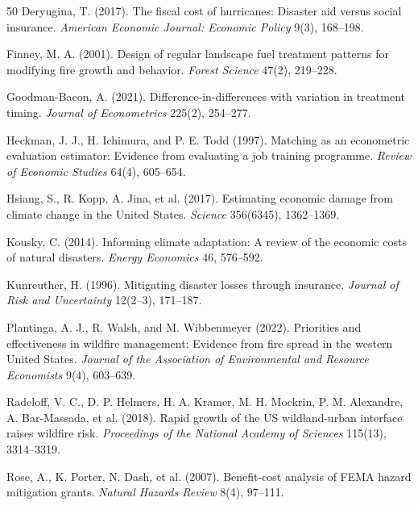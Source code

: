 \documentclass[12pt, letterpaper]{article}
\begin{document}
\begin{thebibliography}{50}
Deryugina, T. (2017). The fiscal cost of hurricanes: Disaster aid versus social insurance. \textit{American Economic Journal: Economic Policy} 9(3), 168--198.

Finney, M. A. (2001). Design of regular landscape fuel treatment patterns for modifying fire growth and behavior. \textit{Forest Science} 47(2), 219--228.

Goodman-Bacon, A. (2021). Difference-in-differences with variation in treatment timing. \textit{Journal of Econometrics} 225(2), 254--277.

Heckman, J. J., H. Ichimura, and P. E. Todd (1997). Matching as an econometric evaluation estimator: Evidence from evaluating a job training programme. \textit{Review of Economic Studies} 64(4), 605--654.

Hsiang, S., R. Kopp, A. Jina, et al. (2017). Estimating economic damage from climate change in the United States. \textit{Science} 356(6345), 1362--1369.

Kousky, C. (2014). Informing climate adaptation: A review of the economic costs of natural disasters. \textit{Energy Economics} 46, 576--592.

Kunreuther, H. (1996). Mitigating disaster losses through insurance. \textit{Journal of Risk and Uncertainty} 12(2--3), 171--187.

Plantinga, A. J., R. Walsh, and M. Wibbenmeyer (2022). Priorities and effectiveness in wildfire management: Evidence from fire spread in the western United States. \textit{Journal of the Association of Environmental and Resource Economists} 9(4), 603--639.

Radeloff, V. C., D. P. Helmers, H. A. Kramer, M. H. Mockrin, P. M. Alexandre, A. Bar-Massada, et al. (2018). Rapid growth of the US wildland-urban interface raises wildfire risk. \textit{Proceedings of the National Academy of Sciences} 115(13), 3314--3319.

Rose, A., K. Porter, N. Dash, et al. (2007). Benefit-cost analysis of FEMA hazard mitigation grants. \textit{Natural Hazards Review} 8(4), 97--111.


\end{thebibliography}
\end{document}
